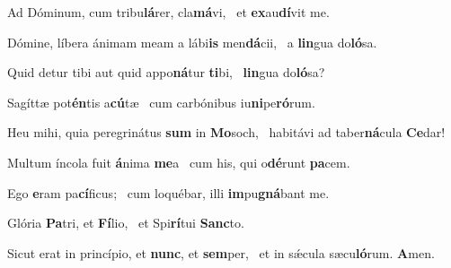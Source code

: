 \item Ad Dóminum, cum tribu\textbf{lá}rer, cla\textbf{má}vi,~\psstar{} et \textbf{ex}au\textbf{dí}vit me.

\item Dómine, líbera ánimam meam a lábi\textbf{is} men\textbf{dá}cii,~\psstar{} a \textbf{lin}gua do\textbf{ló}sa.

\item Quid detur tibi aut quid appo\textbf{ná}tur \textbf{ti}bi,~\psstar{} \textbf{lin}gua do\textbf{ló}sa?

\item Sagíttæ pot\textbf{én}tis a\textbf{cú}tæ~\psstar{} cum carbónibus iu\textbf{ni}pe\textbf{ró}rum.

\item Heu mihi, quia peregrinátus \textbf{sum} in \textbf{Mo}soch,~\psstar{} habitávi ad taber\textbf{ná}cula \textbf{Ce}dar!

\item Multum íncola fuit \textbf{á}nima \textbf{me}a~\psstar{} cum his, qui o\textbf{dé}runt \textbf{pa}cem.

\item Ego \textbf{e}ram pa\textbf{cí}ficus;~\psstar{} cum loquébar, illi \textbf{im}pu\textbf{gná}bant me.

\item Glória \textbf{Pa}tri, et \textbf{Fí}lio,~\psstar{} et Spi\textbf{rí}tui \textbf{Sanc}to.

\item Sicut erat in princípio, et \textbf{nunc}, et \textbf{sem}per,~\psstar{} et in sǽcula sæcu\textbf{ló}rum. \textbf{A}men.